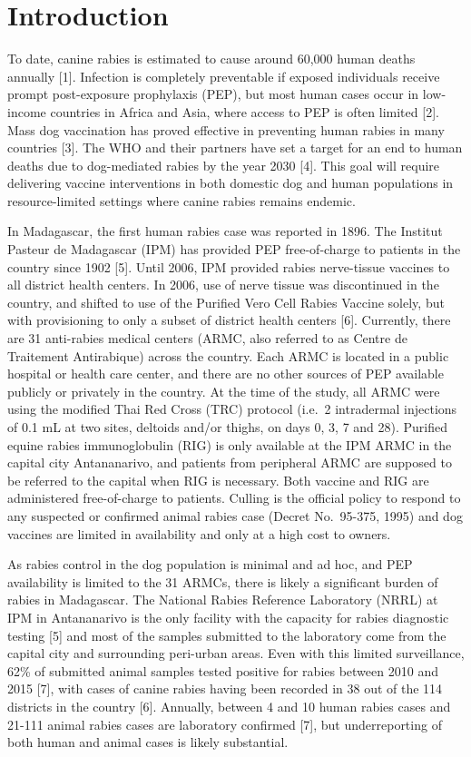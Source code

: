 \documentclass[
]{book}
\begin{document}
\hypertarget{introduction-1}{%
\section{Introduction}\label{introduction-1}}

To date, canine rabies is estimated to cause around 60,000 human deaths annually {[}1{]}. Infection is completely preventable if exposed individuals receive prompt post-exposure prophylaxis (PEP), but most human cases occur in low-income countries in Africa and Asia, where access to PEP is often limited {[}2{]}. Mass dog vaccination has proved effective in preventing human rabies in many countries {[}3{]}. The WHO and their partners have set a target for an end to human deaths due to dog-mediated rabies by the year 2030 {[}4{]}. This goal will require delivering vaccine interventions in both domestic dog and human populations in resource-limited settings where canine rabies remains endemic.

In Madagascar, the first human rabies case was reported in 1896. The Institut Pasteur de Madagascar (IPM) has provided PEP free-of-charge to patients in the country since 1902 {[}5{]}. Until 2006, IPM provided rabies nerve-tissue vaccines to all district health centers. In 2006, use of nerve tissue was discontinued in the country, and shifted to use of the Purified Vero Cell Rabies Vaccine solely, but with provisioning to only a subset of district health centers {[}6{]}. Currently, there are 31 anti-rabies medical centers (ARMC, also referred to as Centre de Traitement Antirabique) across the country. Each ARMC is located in a public hospital or health care center, and there are no other sources of PEP available publicly or privately in the country. At the time of the study, all ARMC were using the modified Thai Red Cross (TRC) protocol (i.e.~2 intradermal injections of 0.1 mL at two sites, deltoids and/or thighs, on days 0, 3, 7 and 28). Purified equine rabies immunoglobulin (RIG) is only available at the IPM ARMC in the capital city Antananarivo, and patients from peripheral ARMC are supposed to be referred to the capital when RIG is necessary. Both vaccine and RIG are administered free-of-charge to patients. Culling is the official policy to respond to any suspected or confirmed animal rabies case (Decret No.~95-375, 1995) and dog vaccines are limited in availability and only at a high cost to owners.

As rabies control in the dog population is minimal and ad hoc, and PEP availability is limited to the 31 ARMCs, there is likely a significant burden of rabies in Madagascar. The National Rabies Reference Laboratory (NRRL) at IPM in Antananarivo is the only facility with the capacity for rabies diagnostic testing {[}5{]} and most of the samples submitted to the laboratory come from the capital city and surrounding peri-urban areas. Even with this limited surveillance, 62\% of submitted animal samples tested positive for rabies between 2010 and 2015 {[}7{]}, with cases of canine rabies having been recorded in 38 out of the 114 districts in the country {[}6{]}. Annually, between 4 and 10 human rabies cases and 21-111 animal rabies cases are laboratory confirmed {[}7{]}, but underreporting of both human and animal cases is likely substantial.
\end{document}
